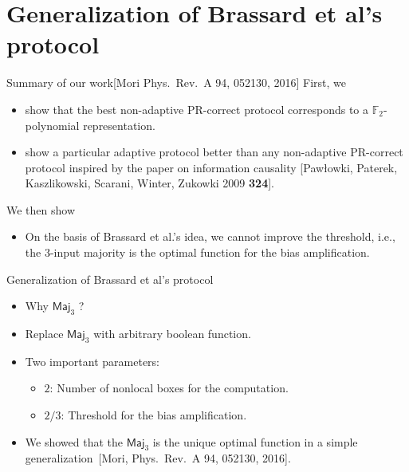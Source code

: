 \documentclass{beamer}
\newcommand\emm[1]{\textcolor{redorange}{{#1}}}
\newcommand\numc[1]{\textcolor{citation}{{\bf #1}}}
\begin{document}
\section{Generalization of Brassard et al's protocol}



\begin{frame}{Summary of our work\newline\normalsize[Mori Phys.~Rev.~A 94, 052130, 2016]}
First, we
\begin{itemize}
\setlength{\itemsep}{1.5em}
\item show that the best \emm{non-adaptive PR-correct} protocol corresponds to a $\mathbb{F}_2$-polynomial representation.
\item show a particular adaptive protocol better than any non-adaptive PR-correct protocol inspired by the paper on \emm{information causality} {\small [Paw\l owki, Paterek, Kaszlikowski, Scarani, Winter, Zukowki 2009 \numc{324}]}.
\end{itemize}

\vspace{1em}
We then show
\begin{itemize}
\item On the basis of Brassard et al.'s idea, we \emm{cannot improve the threshold}, i.e., the 3-input majority is the optimal function for the bias amplification.
\end{itemize}
\end{frame}
\fi

\begin{frame}{Generalization of Brassard et al's protocol}
\begin{itemize}
\setlength{\itemsep}{3.0em}
\item Why $\mathsf{Maj}_3$ ?
\item Replace $\mathsf{Maj}_3$ with arbitrary boolean function.
\item Two important parameters: 
\begin{itemize}
\item $2$: Number of nonlocal boxes for the computation.
\item $2/3$: Threshold for the bias amplification.
\end{itemize}
\item We showed that the $\mathsf{Maj}_3$ is \emm{the unique optimal function} in a simple generalization~[Mori, Phys.~Rev.~A 94, 052130, 2016].
\end{itemize}
\end{frame}
\end{document}
